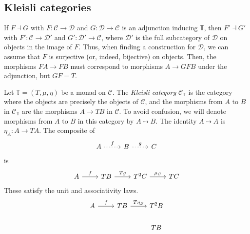 \subsection{Kleisli categories}
If \( F \dashv G \) with \( F : \mathcal C \to \mathcal D \) and \( G : \mathcal D \to \mathcal C \) is an adjunction inducing \( \mathbb T \), then \( F' \dashv G' \) with \( F' : \mathcal C \to \mathcal D' \) and \( G' : \mathcal D' \to \mathcal C \), where \( \mathcal D' \) is the full subcategory of \( \mathcal D \) on objects in the image of \( F \).
Thus, when finding a construction for \( \mathcal D \), we can assume that \( F \) is surjective (or, indeed, bijective) on objects.
Then, the morphisms \( FA \to FB \) must correspond to morphisms \( A \to GFB \) under the adjunction, but \( GF = T \).
\begin{definition}
    Let \( \mathbb T = (T, \mu, \eta) \) be a monad on \( \mathcal C \).
    The \emph{Kleisli category} \( \mathcal C_{\mathbb T} \) is the category where the objects are precisely the objects of \( \mathcal C \), and the morphisms from \( A \) to \( B \) in \( \mathcal C_{\mathbb T} \) are the morphisms \( A \to TB \) in \( \mathcal C \).
    To avoid confusion, we will denote morphisms from \( A \) to \( B \) in this category by \( A \rightdotarrow B \).
    The identity \( A \rightdotarrow A \) is \( \eta_A : A \to TA \).
    The composite of
\[\begin{tikzcd}
	A & B & C
	\arrow["f", dotted, from=1-1, to=1-2]
	\arrow["g", dotted, from=1-2, to=1-3]
\end{tikzcd}\]
    is
\[\begin{tikzcd}
	A & TB & T^2C & TC
	\arrow["f", from=1-1, to=1-2]
	\arrow["Tg", from=1-2, to=1-3]
	\arrow["{\mu_C}", from=1-3, to=1-4]
\end{tikzcd}\]
    These satisfy the unit and associativity laws.
\[\begin{tikzcd}
	A & TB & T^2B \\
	&& TB
	\arrow["f", from=1-1, to=1-2]
	\arrow["{T\eta_B}", from=1-2, to=1-3]

\end{tikzcd}\]
\end{definition}
